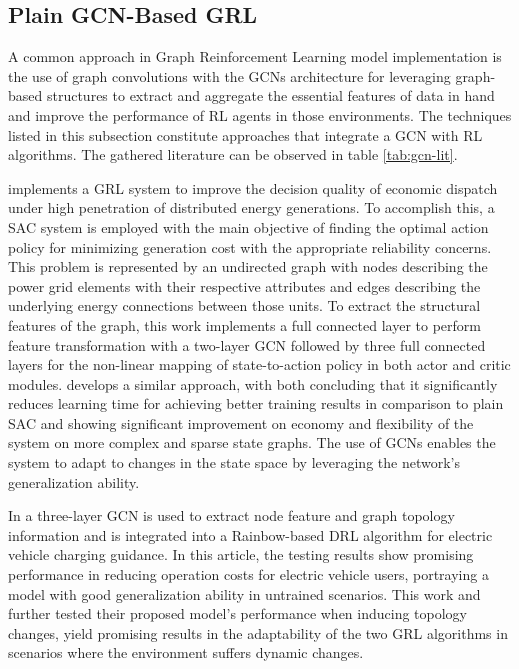 \subsection{Plain GCN-Based GRL} \label{sec:review-gcn}

A common approach in Graph Reinforcement Learning model implementation is the use of graph convolutions with the \acp{GCN} architecture for leveraging graph-based structures to extract and aggregate the essential features of data in hand and improve the performance of \ac{RL} agents in those environments. The techniques listed in this subsection constitute approaches that integrate a \ac{GCN} with \ac{RL} algorithms. The gathered literature can be observed in table \ref{tab:gcn-lit}. \par
\cite{liNovelGraphReinforcement2022} implements a \ac{GRL} system to improve the decision quality of economic dispatch under high penetration of distributed energy generations. To accomplish this, a \ac{SAC} system is employed with the main objective of finding the optimal action policy for minimizing generation cost with the appropriate reliability concerns. This problem is represented by an undirected graph with nodes describing the power grid elements with their respective attributes and edges describing the underlying energy connections between those units. To extract the structural features of the graph, this work implements a full connected layer to perform feature transformation with a two-layer \ac{GCN} followed by three full connected layers for the non-linear mapping of state-to-action policy in both actor and critic modules. \cite{chenScalableGraphReinforcement2023} develops a similar approach, with both concluding that it significantly reduces learning time for achieving better training results in comparison to plain \ac{SAC} and showing significant improvement on economy and flexibility of the system on more complex and sparse state graphs. The use of \acp{GCN} enables the system to adapt to changes in the state space by leveraging the network's generalization ability.\par
In \cite{xingGraphReinforcementLearningBased2023} a three-layer \ac{GCN} is used to extract node feature and graph topology information and is integrated into a Rainbow-based \cite{hesselRainbowCombiningImprovements2018} \ac{DRL} algorithm for electric vehicle charging guidance. In this article, the testing results show promising performance in reducing operation costs for electric vehicle users, portraying a model with good generalization ability in untrained scenarios. This work and  \cite{chenScalableGraphReinforcement2023} further tested their proposed model's performance when inducing topology changes, yield promising results in the adaptability of the two \ac{GRL} algorithms in scenarios where the environment suffers dynamic changes.\par
